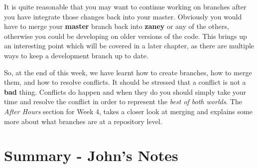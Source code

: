 It is quite reasonable that you may want to continue working on branches after you have integrate those changes back into your master.  Obviously you would have to merge your \textbf{master} branch back into \textbf{zaney} or any of the others, otherwise you could be developing on older versions of the code.  This brings up an interesting point which will be covered in a later chapter, as there are multiple ways to keep a development branch up to date.

So, at the end of this week, we have learnt how to create branches, how to merge them, and how to resolve conflicts.  It should be stressed that a conflict is not a \textbf{bad} thing.  Conflicts do happen and when they do you should simply take your time and resolve the conflict in order to represent the \emph{best of both worlds}.  The \emph{After Hours} section for Week 4, takes a closer look at merging and explains some more about what branches are at a repository level.

\clearpage

\section{Summary - John's Notes}
